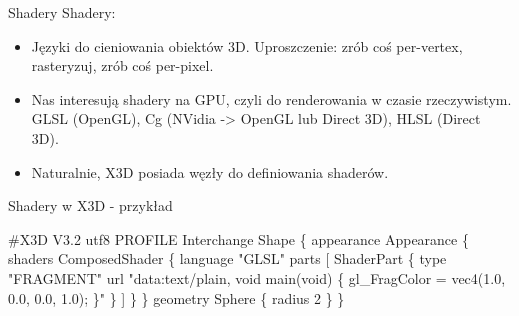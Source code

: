 \documentclass{beamer}
\begin{document}
\begin{frame}{Shadery}
Shadery:
\begin{itemize}
  \item Języki do cieniowania obiektów 3D. Uproszczenie: zrób coś per-vertex,
    rasteryzuj, zrób coś per-pixel.
  \item Nas interesują shadery na GPU, czyli do renderowania w czasie
    rzeczywistym. GLSL (OpenGL), Cg (NVidia -> OpenGL lub Direct 3D),
    HLSL (Direct 3D).
  \item Naturalnie, X3D posiada węzły do definiowania shaderów.
\end{itemize}
\end{frame}

\begin{frame}{Shadery w X3D - przykład}
\begin{semiverbatim}
\#X3D V3.2 utf8
PROFILE Interchange
Shape \{
  appearance Appearance \{ shaders ComposedShader \{
    language "GLSL"
    parts [
      ShaderPart \{ type "FRAGMENT"
        url "data:text/plain,
        void main(void)
        \{
          gl\_FragColor = vec4(1.0, 0.0, 0.0, 1.0);
        \}" \}
    ]
  \} \}
  geometry Sphere \{ radius 2 \}
\}
\end{semiverbatim}
\end{frame}
\end{document}
